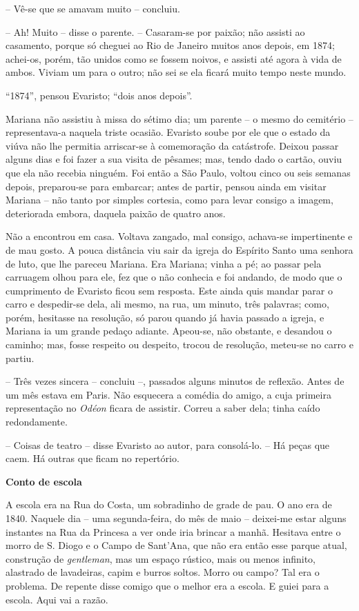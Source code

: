 -- Vê-se que se amavam muito -- concluiu.

-- Ah! Muito -- disse o parente. -- Casaram-se por paixão; não assisti
ao casamento, porque só cheguei ao Rio de Janeiro muitos anos depois, em
1874; achei-os, porém, tão unidos como se fossem noivos, e assisti até
agora à vida de ambos. Viviam um para o outro; não sei se ela ficará
muito tempo neste mundo.

``1874'', pensou Evaristo; ``dois anos depois''.

Mariana não assistiu à missa do sétimo dia; um parente -- o mesmo do
cemitério -- representava-a naquela triste ocasião. Evaristo soube por
ele que o estado da viúva não lhe permitia arriscar-se à comemoração da
catástrofe. Deixou passar alguns dias e foi fazer a sua visita de
pêsames; mas, tendo dado o cartão, ouviu que ela não recebia ninguém.
Foi então a São Paulo, voltou cinco ou seis semanas depois, preparou-se
para embarcar; antes de partir, pensou ainda em visitar Mariana -- não
tanto por simples cortesia, como para levar consigo a imagem,
deteriorada embora, daquela paixão de quatro anos.

Não a encontrou em casa. Voltava zangado, mal consigo, achava-se
impertinente e de mau gosto. A pouca distância viu sair da igreja do
Espírito Santo uma senhora de luto, que lhe pareceu Mariana. Era
Mariana; vinha a pé; ao passar pela carruagem olhou para ele, fez que o
não conhecia e foi andando, de modo que o cumprimento de Evaristo ficou
sem resposta. Este ainda quis mandar parar o carro e despedir-se dela,
ali mesmo, na rua, um minuto, três palavras; como, porém, hesitasse na
resolução, só parou quando já havia passado a igreja, e Mariana ia um
grande pedaço adiante. Apeou-se, não obstante, e desandou o caminho;
mas, fosse respeito ou despeito, trocou de resolução, meteu-se no carro
e partiu.

-- Três vezes sincera -- concluiu --, passados alguns minutos de
reflexão. Antes de um mês estava em Paris. Não esquecera a comédia do
amigo, a cuja primeira representação no \emph{Odéon} ficara de assistir.
Correu a saber dela; tinha caído redondamente.

-- Coisas de teatro -- disse Evaristo ao autor, para consolá-lo. -- Há
peças que caem. Há outras que ficam no repertório.

\textbf{Conto de escola}

A escola era na Rua do Costa, um sobradinho de grade de pau. O ano era
de 1840. Naquele dia -- uma segunda-feira, do mês de maio -- deixei-me
estar alguns instantes na Rua da Princesa a ver onde iria brincar a
manhã. Hesitava entre o morro de S. Diogo e o Campo de Sant'Ana, que não
era então esse parque atual, construção de \emph{gentleman}, mas um
espaço rústico, mais ou menos infinito, alastrado de lavadeiras, capim e
burros soltos. Morro ou campo? Tal era o problema. De repente disse
comigo que o melhor era a escola. E guiei para a escola. Aqui vai a
razão.

